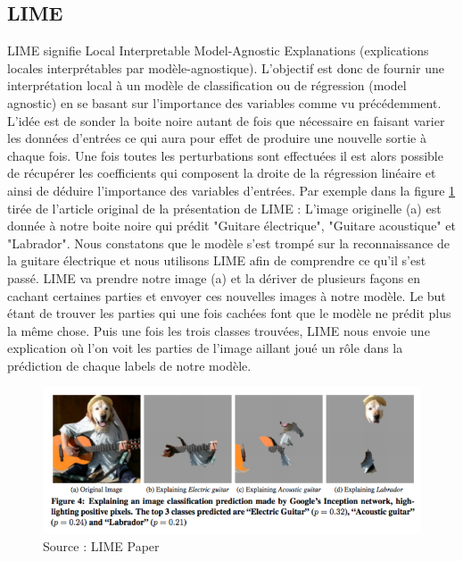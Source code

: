 \subsection{LIME}
LIME signifie Local Interpretable Model-Agnostic Explanations (explications locales interprétables par modèle-agnostique). L'objectif est donc de fournir une interprétation local à un modèle de classification ou de régression (model agnostic) en se basant sur l’importance des variables comme vu précédemment. L'idée est de sonder la boite noire autant de fois que nécessaire en faisant varier les données d'entrées ce qui aura pour effet de produire une nouvelle sortie à chaque fois. Une fois toutes les perturbations sont effectuées il est alors possible de récupérer les coefficients qui composent la droite de la régression linéaire et ainsi de déduire l'importance des variables d'entrées. Par exemple dans la figure \ref{limeExemple} tirée de l'article original de la présentation de LIME\cite{limePaper} : L'image originelle (a) est donnée à notre boite noire qui prédit "Guitare électrique", "Guitare acoustique" et "Labrador". Nous constatons que le modèle s'est trompé sur la reconnaissance de la guitare électrique et nous utilisons LIME afin de comprendre ce qu'il s'est passé. LIME va prendre notre image (a) et la dériver de plusieurs façons en cachant certaines parties et envoyer ces nouvelles images à notre modèle. Le but étant de trouver les parties qui une fois cachées font que le modèle ne prédit plus la même chose. Puis une fois les trois classes trouvées, LIME nous envoie une explication où l'on voit les parties de l'image aillant joué un rôle dans la prédiction de chaque labels de notre modèle.
\begin{figure}[h]
\centering
\includegraphics[scale=0.35]{src_img/limeExemple.png}
\caption{Source : LIME Paper \cite{limePaper}}
\label{limeExemple}
\end{figure}

